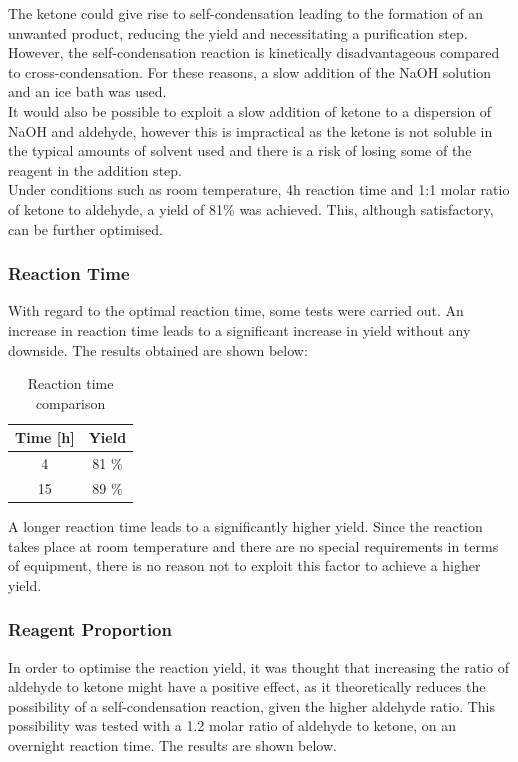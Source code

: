 \documentclass[../Master.tex]{subfiles}
\begin{document}
The ketone could give rise to self-condensation leading to the formation of an unwanted product, reducing the yield and necessitating a purification step. However, the self-condensation reaction is kinetically disadvantageous compared to cross-condensation. For these reasons, a slow addition of the NaOH solution and an ice bath was used.\\
It would also be possible to exploit a slow addition of ketone to a dispersion of NaOH and aldehyde, however this is impractical as the ketone is not soluble in the typical amounts of solvent used and there is a risk of losing some of the reagent in the addition step.\\
Under conditions such as room temperature, 4h reaction time and 1:1 molar ratio of ketone to aldehyde, a yield of 81\% was achieved. This, although satisfactory, can be further optimised.

\subsubsection{Reaction Time}

With regard to the optimal reaction time, some tests were carried out. An increase in reaction time leads to a significant increase in yield without any downside. The results obtained are shown below:

\begin{table}[h!]
	\centering
	\begin{tabular}[b]{cc}
		\toprule
		Time [h] & Yield \\
		\midrule
		4        & 81 \% \\
		15       & 89 \% \\
		\bottomrule
	\end{tabular}
	\caption{Reaction time comparison}\label{tab:hydrazine-ratio}
\end{table}

A longer reaction time leads to a significantly higher yield. Since the reaction takes place at room temperature and there are no special requirements in terms of equipment, there is no reason not to exploit this factor to achieve a higher yield.

\subsubsection{Reagent Proportion}

In order to optimise the reaction yield, it was thought that increasing the ratio of aldehyde to ketone might have a positive effect, as it theoretically reduces the possibility of a self-condensation reaction, given the higher aldehyde ratio.
This possibility was tested with a 1.2 molar ratio of aldehyde to ketone, on an overnight reaction time. The results are shown below.
\end{document}
